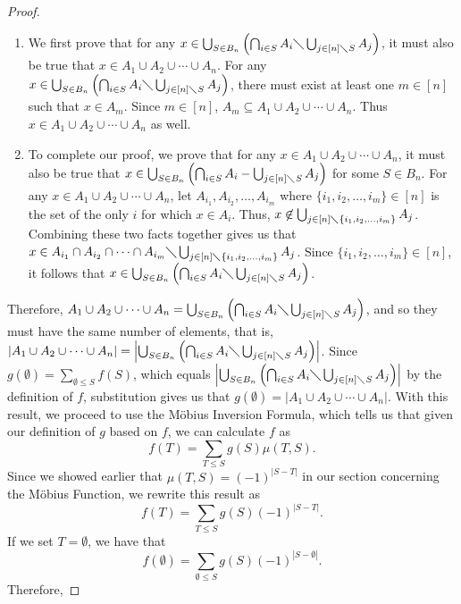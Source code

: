 \documentclass{article} %
\theoremstyle{definition}
\theoremstyle{plain}
\begin{document}
\begin{proof}
\begin{enumerate}
\item{We first prove that for any $x\in \bigcup_{S\in B_n}\left(\bigcap_{i\in S}A_i\diagdown\bigcup_{j\in [n]\diagdown S}A_j\right)$, it must also be true that $x\in A_1\cup A_2 \cup \cdots \cup A_n$. For any $x\in \bigcup_{S\in B_n}\left(\bigcap_{i\in S}A_i\diagdown\bigcup_{j\in [n]\diagdown S}A_j\right)$, there must exist at least one $m\in [n]$ such that $x\in A_m$. Since $m\in [n]$, $A_m\subseteq A_1\cup A_2 \cup \cdots \cup A_n$. Thus $x\in A_1\cup A_2 \cup \cdots \cup A_n$ as well.}
\item{To complete our proof, we prove that for any $x\in A_1\cup A_2 \cup \cdots \cup A_n$, it must also be true that $x\in \bigcup_{S\in B_n}\left(\bigcap_{i\in S}A_i-\bigcup_{j\in [n]\diagdown S}A_j\right)$ for some $S\in B_n$. For any $x\in A_1\cup A_2 \cup \cdots \cup A_n$, let $A_{i_1},A_{i_2},\ldots,A_{i_m}$ where $\{i_1,i_2,\ldots,i_m\}\in [n]$ is the set of the only $i$ for which $x\in A_i$. Thus, $x\not\in \bigcup_{j\in [n]\diagdown \{i_1,i_2,\ldots,i_m\}}A_j$. Combining these two facts together gives us that $x\in A_{i_1}\cap A_{i_2}\cap \cdots \cap A_{i_m} \diagdown \bigcup _{j\in [n]\diagdown \{i_1,i_2,\ldots,i_m\}}A_j$. Since $\{i_1,i_2,\ldots,i_m\}\in [n]$, it follows that $x\in\bigcup_{S\in B_n}\left(\bigcap_{i\in S}A_i\diagdown\bigcup_{j\in [n]\diagdown S}A_j\right)$.}
\end{enumerate}
Therefore,  $A_1\cup A_2 \cup \cdots \cup A_n=\bigcup_{S\in B_n}\left(\bigcap_{i\in S}A_i\diagdown\bigcup_{j\in [n]\diagdown S}A_j\right)$, and so they must have the same number of elements, that is, $\left|A_1\cup A_2 \cup \cdots \cup A_n\right|=\left|\bigcup_{S\in B_n}\left(\bigcap_{i\in S}A_i\diagdown\bigcup_{j\in [n]\diagdown S}A_j\right)\right|$. Since $g(\emptyset)=\sum_{\emptyset \leq S}f(S)$, which equals $\left|\bigcup_{S\in B_n}\left(\bigcap_{i\in S}A_i\diagdown\bigcup_{j\in [n]\diagdown S}A_j\right)\right|$ by the definition of $f$, substitution gives us that $g(\emptyset)=\left|A_1\cup A_2 \cup \cdots \cup A_n\right|$. With this result, we proceed to use the M\"{o}bius Inversion Formula, which tells us that given our definition of $g$ based on $f$, we can calculate $f$ as
$$f(T)=\sum_{T\leq S}g(S)\mu(T,S).$$
Since we showed earlier that $\mu(T,S)=(-1)^{|S-T|}$ in our section concerning the M\"{o}bius Function, we rewrite this result as
$$f(T)=\sum_{T\leq S}g(S)(-1)^{|S-T|}.$$
If we set $T=\emptyset$, we have that 
$$f(\emptyset)=\sum_{\emptyset \leq S}g(S)(-1)^{|S-\emptyset|}.$$
Therefore,

\end{proof}
\end{document}

